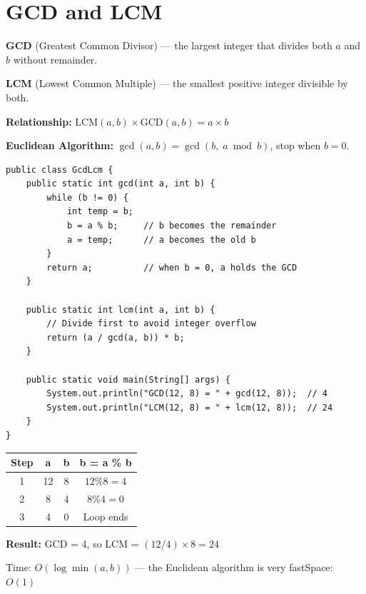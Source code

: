 \documentclass[12pt,a4paper,oneside]{book}
\begin{document}
\section{GCD and LCM}

\textbf{GCD} (Greatest Common Divisor) --- the largest integer that divides both $a$ and $b$ without remainder.

\textbf{LCM} (Lowest Common Multiple) --- the smallest positive integer divisible by both.

\textbf{Relationship:} $\text{LCM}(a,b) \times \text{GCD}(a,b) = a \times b$

\textbf{Euclidean Algorithm:} $\gcd(a, b) = \gcd(b,\; a \bmod b)$, stop when $b = 0$.

\begin{lstlisting}[caption={GCD and LCM using Euclidean Algorithm}]
public class GcdLcm {
    public static int gcd(int a, int b) {
        while (b != 0) {
            int temp = b;
            b = a % b;     // b becomes the remainder
            a = temp;      // a becomes the old b
        }
        return a;          // when b = 0, a holds the GCD
    }

    public static int lcm(int a, int b) {
        // Divide first to avoid integer overflow
        return (a / gcd(a, b)) * b;
    }

    public static void main(String[] args) {
        System.out.println("GCD(12, 8) = " + gcd(12, 8));  // 4
        System.out.println("LCM(12, 8) = " + lcm(12, 8));  // 24
    }
}
\end{lstlisting}

\begin{dryrun}
\begin{center}
\begin{tabular}{cccc}
\toprule
\textbf{Step} & \textbf{a} & \textbf{b} & \textbf{b = a \% b}\\
\midrule
1 & 12 & 8 & $12 \% 8 = 4$\\
2 & 8  & 4 & $8 \% 4 = 0$\\
3 & 4  & 0 & Loop ends\\
\bottomrule
\end{tabular}
\end{center}
\textbf{Result:} GCD = 4, so LCM = $(12 / 4) \times 8 = 24$
\end{dryrun}

\begin{complexity}
Time: $O(\log \min(a,b))$ --- the Euclidean algorithm is very fast\quad Space: $O(1)$
\end{complexity}
\end{document}
